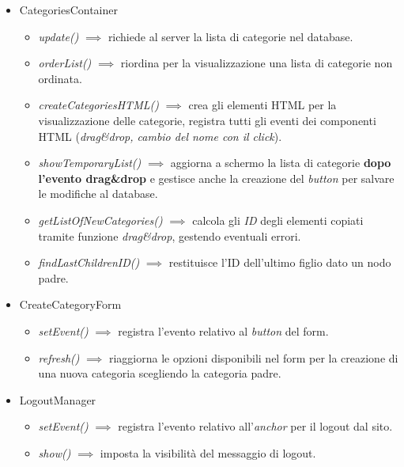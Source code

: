 \begin{itemize}
\tightlist
\item
  CategoriesContainer

  \begin{itemize}
  \tightlist
  \item
    \emph{update()} \(\implies\) richiede al server la lista di
    categorie nel database.
  \item
    \emph{orderList()} \(\implies\) riordina per la visualizzazione una
    lista di categorie non ordinata.
  \item
    \emph{createCategoriesHTML()} \(\implies\) crea gli elementi HTML
    per la visualizzazione delle categorie, registra tutti gli eventi
    dei componenti HTML (\emph{drag\&drop, cambio del nome con il
    click}).
  \item
    \emph{showTemporaryList()} \(\implies\) aggiorna a schermo la lista
    di categorie \textbf{dopo l'evento drag\&drop} e gestisce anche la
    creazione del \emph{button} per salvare le modifiche al database.
  \item
    \emph{getListOfNewCategories()} \(\implies\) calcola gli \emph{ID}
    degli elementi copiati tramite funzione \emph{drag\&drop}, gestendo
    eventuali errori.
  \item
    \emph{findLastChildrenID()} \(\implies\) restituisce l'ID
    dell'ultimo figlio dato un nodo padre.
  \end{itemize}
\item
  CreateCategoryForm

  \begin{itemize}
  \tightlist
  \item
    \emph{setEvent()} \(\implies\) registra l'evento relativo al
    \emph{button} del form.
  \item
    \emph{refresh()} \(\implies\) riaggiorna le opzioni disponibili nel
    form per la creazione di una nuova categoria scegliendo la categoria
    padre.
  \end{itemize}
\item
  LogoutManager

  \begin{itemize}
  \tightlist
  \item
    \emph{setEvent()} \(\implies\) registra l'evento relativo
    all'\emph{anchor} per il logout dal sito.
  \item
    \emph{show()} \(\implies\) imposta la visibilità del messaggio di
    logout.
  \end{itemize}
\end{itemize}

